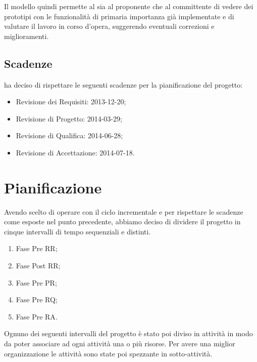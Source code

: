Il modello quindi permette al sia al proponente che al committente di vedere dei prototipi con le funzionalità di primaria importanza già implementate e di valutare il lavoro in corso d'opera, suggerendo eventuali correzioni e miglioramenti.


\subsection{Scadenze}
\label{2.6}
\NomeGruppo{} ha deciso di rispettare le seguenti scadenze per la pianificazione del progetto:
\begin{itemize}
\item Revisione dei Requisiti: 2013-12-20;
\item Revisione di Progetto:  2014-03-29;
\item Revisione di Qualifica: 2014-06-28;
\item Revisione di Accettazione: 2014-07-18.
\end{itemize}

\newpage
\section{Pianificazione}
\label{3.0}
Avendo scelto di operare con il ciclo incrementale e per rispettare le scadenze come esposte nel punto precedente, abbiamo deciso di dividere il progetto in cinque intervalli di tempo sequenziali e distinti.

\begin{enumerate}
\item Fase Pre RR;
\item Fase Post RR;
\item Fase Pre PR;
\item Fase Pre RQ;
\item Fase Pre RA.
\end{enumerate}

Ognuno dei seguenti intervalli del progetto è stato poi diviso in attività in modo da poter associare ad ogni attività una o più risorse. Per avere una miglior organizzazione le attività sono state poi spezzante in sotto-attività.



\newpage


\newpage


\newpage


\newpage


